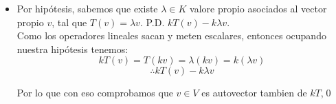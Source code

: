 \begin{itemize}
\begin{itemize}
    $$T(v)=\lambda v \mbox{ , } S(v)=\mu v :\lambda,\mu\in K :$$
    de donde podemos obtener abriendo sumas sobre las transfromaciones linelaes y factorizando que:
    $$T(v)+S(v)=(T+S)(v)=kv+lv=(k+l)v$$
    \[\therefore (T+S)(v)=(\lambda+\mu)v\]
    Por lo que con eso comprobamos que $v\in V$ es autovector tambien de $T+S$,\qed
    
    \item Por hip\'otesis, sabemos que existe $\lambda\in  K$ valore propio asociados al vector propio $v$, tal que $T(v)=\lambda v$. P.D. $kT(v)-k\lambda v$.\\
    Como los operadores lineales sacan y meten escalares, entonces ocupando nuestra hip\'otesis tenemos:
    \[kT(v)=T(kv)=\lambda (kv)=k(\lambda v)\]
    \[\therefore kT(v)-k\lambda v\]
    
    Por lo que con eso comprobamos que $v\in V$ es autovector tambien de $kT$,\qed
    \end{itemize}
    
\end{itemize}